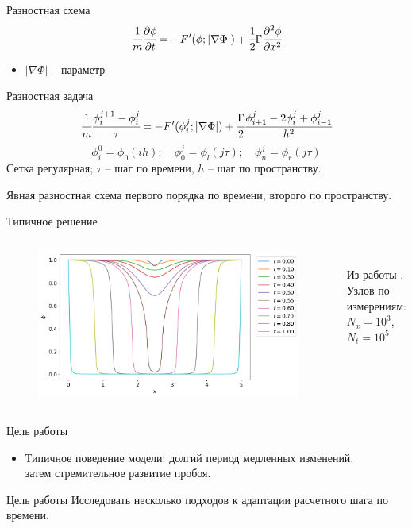 \begin{frame}{Разностная схема}
\vspace{-0.9cm}
\[
	\cfrac{1}{m} \cfrac{\partial \phi}{\partial t} = -F'(\phi; |\nabla \Phi|) + \cfrac{1}{2} \Gamma \cfrac{\partial^2 \phi}{\partial x^2}
\]
\vspace{-0.4cm}
\begin{itemize}
	\item $|\nabla \Phi|$ -- параметр
\end{itemize}
\begin{block}{Разностная задача}
	\[
		\cfrac{1}{m} \cfrac{\phi_i^{j + 1} - \phi_i^j}{\tau} = -F'(\phi_i^j; |\nabla \Phi|) + \cfrac{\Gamma}{2} \cfrac{\phi_{i + 1}^j - 2 \phi_i^j + \phi_{i - 1}^j}{h^2}
	\]
	\[\phi_i^0 = \phi_0(ih); \quad \phi_0^j = \phi_l(j \tau); \quad \phi_n^j = \phi_r(j \tau)\]
	Сетка регулярная; $\tau$ -- шаг по времени, $h$ -- шаг по пространству.
\end{block}
Явная разностная схема первого порядка по времени, второго по пространству.
\end{frame}


\begin{frame}{Типичное решение}
\vspace{-0.4cm}
\begin{columns}
\begin{figure}
	\includegraphics[width=\textwidth]{figures/typical_solution.png}
\end{figure}
\hfill \\
\vspace{3.5cm}
\hspace{-2.5cm}
Из работы \cite{ponomarev_stability}. \\
\hspace{-2.5cm}
Узлов по измерениям: \\
\hspace{-2.5cm}
$N_x = 10^3$, $N_t = 10^5$
\end{columns}
\end{frame}


\begin{frame}{Цель работы}
\begin{itemize}
	\item Типичное поведение модели: долгий период медленных изменений, \\ затем стремительное развитие пробоя.
\end{itemize}
\begin{block}{Цель работы}
	Исследовать несколько подходов к адаптации расчетного шага по времени.
\end{block}
\end{frame}